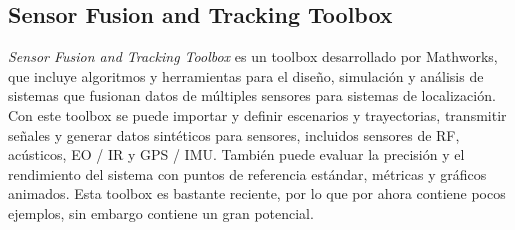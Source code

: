 \subsection{Sensor Fusion and Tracking Toolbox}

\emph{Sensor Fusion and Tracking Toolbox} \cite{Mathworks} es un toolbox desarrollado por Mathworks, que incluye algoritmos y herramientas para el diseño, simulación y análisis de sistemas que fusionan datos de múltiples sensores para sistemas de localización. Con este toolbox se puede importar y definir escenarios y trayectorias, transmitir señales y generar datos sintéticos para sensores, incluidos sensores de RF, acústicos, EO / IR y GPS / IMU. También puede evaluar la precisión y el rendimiento del sistema con puntos de referencia estándar, métricas y gráficos animados. Esta toolbox es bastante reciente, por lo que por ahora contiene pocos ejemplos, sin embargo contiene un gran potencial.  